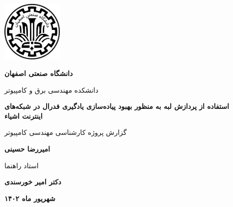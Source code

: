 \thispagestyle{empty}
\begin{center}
\includegraphics[height=3cm]{iut_logo.png}
\vspace{0.4cm}

\textbf{دانشگاه صنعتی اصفهان}\\
\vspace{0.4cm}

{\large

	دانشکده مهندسی برق و کامپیوتر
}
\vspace{3.5cm}

{\Large
	\textbf{استفاده از پردازش لبه به منظور بهبود پیاده‌سازی یادگیری فدرال در شبکه‌های اینترنت اشیاء}\\
}
\vspace{3.5cm}

{\Large
	گزارش پروژه کارشناسی مهندسی کامپیوتر \\
}
\vspace{1cm}

{\large
	\textbf{امیررضا حسینی}\\
}
\vspace{3.5cm}

{\large
	استاد راهنما\\
}
\vspace{0.5cm}

{\large
	\textbf{دکتر امیر خورسندی}\\
}
\vspace{3.5cm}

\textbf{شهریور ماه ۱۴۰۲}

\end{center}
\restoregeometry
\pagebreak



